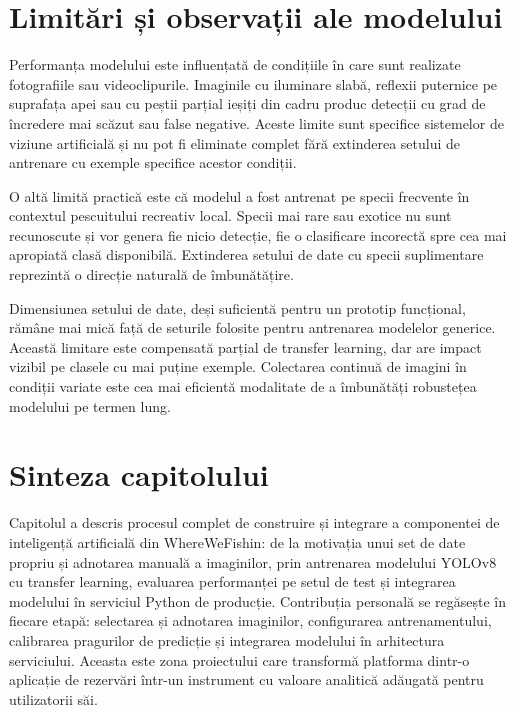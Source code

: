 \section{Limitări și observații ale modelului}

Performanța modelului este influențată de condițiile în care sunt realizate fotografiile sau videoclipurile. Imaginile cu iluminare slabă, reflexii puternice pe suprafața apei sau cu peștii parțial ieșiți din cadru produc detecții cu grad de încredere mai scăzut sau false negative. Aceste limite sunt specifice sistemelor de viziune artificială și nu pot fi eliminate complet fără extinderea setului de antrenare cu exemple specifice acestor condiții.

O altă limită practică este că modelul a fost antrenat pe specii frecvente în contextul pescuitului recreativ local. Specii mai rare sau exotice nu sunt recunoscute și vor genera fie nicio detecție, fie o clasificare incorectă spre cea mai apropiată clasă disponibilă. Extinderea setului de date cu specii suplimentare reprezintă o direcție naturală de îmbunătățire.

Dimensiunea setului de date, deși suficientă pentru un prototip funcțional, rămâne mai mică față de seturile folosite pentru antrenarea modelelor generice. Această limitare este compensată parțial de transfer learning, dar are impact vizibil pe clasele cu mai puține exemple. Colectarea continuă de imagini în condiții variate este cea mai eficientă modalitate de a îmbunătăți robustețea modelului pe termen lung.

\section{Sinteza capitolului}

Capitolul a descris procesul complet de construire și integrare a componentei de inteligență artificială din WhereWeFishin: de la motivația unui set de date propriu și adnotarea manuală a imaginilor, prin antrenarea modelului YOLOv8 cu transfer learning, evaluarea performanței pe setul de test și integrarea modelului în serviciul Python de producție. Contribuția personală se regăsește în fiecare etapă: selectarea și adnotarea imaginilor, configurarea antrenamentului, calibrarea pragurilor de predicție și integrarea modelului în arhitectura serviciului. Aceasta este zona proiectului care transformă platforma dintr-o aplicație de rezervări într-un instrument cu valoare analitică adăugată pentru utilizatorii săi.
